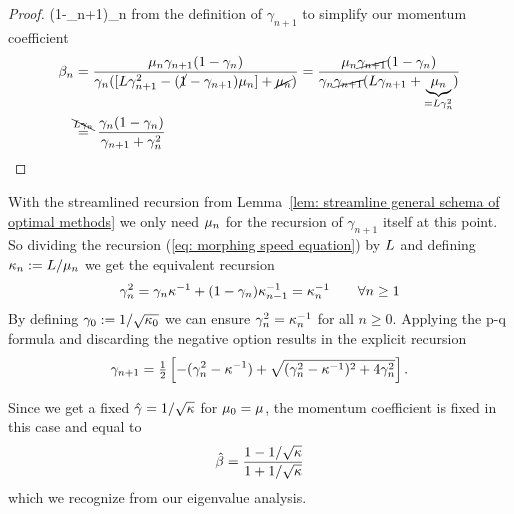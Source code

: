 \begin{proof}
	(1-\gamma_{n+1})\lbound_n\) from the definition of \(\gamma_{n+1}\) to simplify our
	momentum coefficient
	\begin{align*}
		\momCoeff_n
		&= \frac{\lbound_n \gamma_{n+1}(1-\gamma_n)}{
			\gamma_n([\ubound\gamma_{n+1}^2 - (\cancel{1}-\gamma_{n+1})\lbound_n] +\cancel{\lbound_n})
		}
		= \frac{\lbound_n\cancel{\gamma_{n+1}}(1-\gamma_n)}{
			\gamma_n\cancel{\gamma_{n+1}}(\ubound\gamma_{n+1} + \underbrace{\lbound_n}_{=\ubound\gamma_n^2})
		}\\
		&\lxeq{\bcancel{\ubound\gamma_n}} \frac{\gamma_n(1-\gamma_n)}{\gamma_{n+1} + \gamma_n^2}
		\qedhere
	\end{align*}
\end{proof}

With the streamlined recursion from Lemma~\ref{lem: streamline general schema of optimal methods}
we only need \(\mu_n\) for the recursion of \(\gamma_{n+1}\) itself at this
point. So dividing the recursion (\ref{eq: morphing speed equation}) by
\(L\) and defining \(\kappa_n:=L/\mu_n\) we get the equivalent
recursion
\begin{align}\label{eq: morphing speed recursion using condition}
	\gamma_n^2
	= \gamma_n \kappa^{-1} + (1-\gamma_n)\kappa_{n-1}^{-1}
	= \kappa^{-1}_n \qquad \forall n\ge 1
\end{align}
By defining \(\gamma_0:=1/\sqrt{\kappa_0}\) we can ensure
\(\gamma_n^2 = \kappa_n^{-1}\) for all \(n\ge0\). Applying the p-q formula
and discarding the negative option results in the explicit recursion
\begin{align*}
	\gamma_{n+1}
	= \tfrac12 \left[
		-(\gamma_n^2 - \kappa^{-1})
		+ \sqrt{(\gamma_n^2 - \kappa^{-1})^2 + 4 \gamma_n^2}
	\right].
\end{align*}

Since we get a fixed \(\hat{\gamma}=1/\sqrt{\kappa}\) for
\(\mu_0=\mu\), the momentum coefficient is fixed in this case and equal to 
\begin{align*}
	\hat{\beta} = \frac{1-1/\sqrt{\kappa}}{1+1/\sqrt{\kappa}}
\end{align*}
which we recognize from our eigenvalue analysis.

